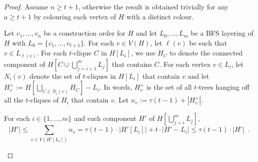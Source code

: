\documentclass[kpfonts]{patmorin}
\theoremstyle{named}
\begin{document}
\begin{proof}
    Assume $n\ge t+1$, otherwise the result is  obtained trivially for any $a\ge t+1$ by colouring each vertex of $H$ with a distinct colour.




    Let $v_1,\ldots,v_n$ be a construction order for $H$ and let $L_0,\ldots,L_m$ be a BFS layering of $H$ with $L_0=\{v_1,\ldots,v_{t+1}\}$.
    For each $v\in V(H)$, let $\ell(v)$ be such that $v\in L_{\ell(v)}$.
    For each $t$-clique $C$ in $H[L_i]$, we use $H_C$ to denote the connected component of $H[C\cup\bigcup_{j=i+1}^m L_j]$ that contains $C$.
    For each vertex $v\in L_i$, let $N_i(v)$ denote the set of $t$-cliques in $H[L_i]$ that contain $v$ and let $H^+_v:=H[\bigcup_{C\in N_i(v)} H_C]-L_i$.  In words, $H^+_v$ is the set of all $t$-trees hanging off all the $t$-cliques of $H_i$ that contain $v$.  Let $n_v:=\tau(t-1)+|H^+_v|$.

    \begin{clm}\label{size-claim}
        For each $i\in\{1,\ldots,m\}$ and each component $H'$ of $H[\bigcup_{j=i}^m L_j]$,
        \[
            |H'| \le \sum_{v\in V(H'[L_i])} n_v = \tau(t-1)\cdot|H'[L_i] |+ t\cdot|H'-L_i|
            \le \tau(t-1)\cdot|H'| \enspace .
        \]
    \end{clm}


\end{proof}
\end{document}
